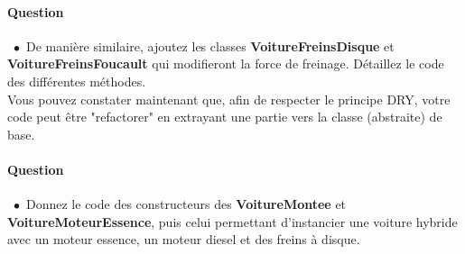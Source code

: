\documentclass[a4paper,11pt]{exam}
\newcommand{\point}{$\bullet$\ }
\begin{document}

\paragraph*{\textsf{Question \thequestion}}\ 
\point De manière similaire, ajoutez les classes \textbf{VoitureFreinsDisque} et \textbf{VoitureFreinsFoucault} qui modifieront la force de freinage. Détaillez le code des différentes méthodes.\\
Vous pouvez constater maintenant que, afin de respecter le principe DRY, votre code peut être "refactorer" en extrayant une partie vers la classe (abstraite) de base.

\paragraph*{\textsf{Question \thequestion}}\ 
\point Donnez le code des constructeurs des \textbf{VoitureMontee} et \textbf{VoitureMoteurEssence}, puis celui permettant d'instancier une voiture hybride avec un moteur essence, un moteur diesel et des freins à disque.

\end{document}
